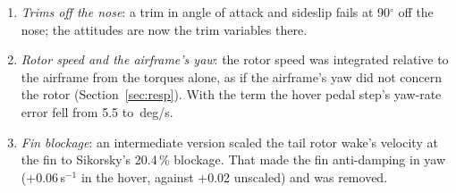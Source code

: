 \documentclass[10pt,a4paper,twocolumn]{article}
\begin{document}
\begin{enumerate}
part with the flight path, so that in sideward flight the tail rotor met a crosswind 1.4 times the real one and, through its cant, a phantom
climb from 2.1 times the inflow of downwash. The pedal swing between winds from the right and from the left was nearly twice the test's.
The ring wake (Section~\ref{sec:model}) at the tail rotor, fin and stabilator brought the crosswind pedal error from \NXGped{} to
\NXBped\,in rms and the longitudinal cyclic error from \NXGlon{} to \NXBlon\,in, without changing forward flight.
\item \emph{Trims off the nose}: a trim in angle of attack and sideslip fails at 90$^\circ$ off the nose; the attitudes are now the trim
variables there.
\item \emph{Rotor speed and the airframe's yaw}: the rotor speed was integrated relative to the airframe from the torques alone, as if the
airframe's yaw did not concern the rotor (Section~\ref{sec:resp}). With the term the hover pedal step's yaw-rate error fell from 5.5 to
\NRpedrms\,deg/s.
\item \emph{Fin blockage}: an intermediate version scaled the tail rotor wake's velocity at the fin to Sikorsky's 20.4\,\% blockage. That made
the fin anti-damping in yaw ($+$0.06\,s$^{-1}$ in the hover, against $+$0.02 unscaled) and was removed.
\end{enumerate}

\end{document}
